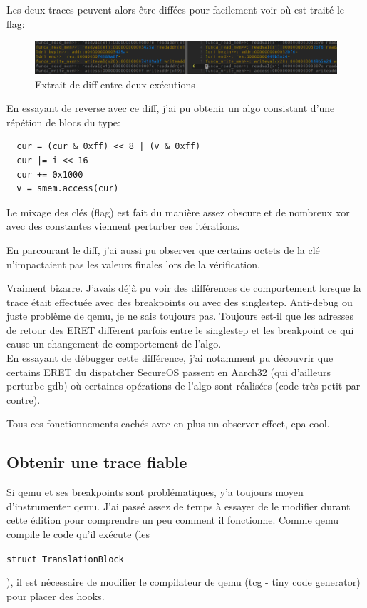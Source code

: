 \documentclass[14pt]{article}
\newcommand{\inlinebox}[2]{%
\colorbox{bg}{%
\parbox[b][0.6em]{\widthof{\texttt{#2}}}{\texttt{#2}}
}
}
\newcommand{\inlinec}[1]{ \inlinebox{c}{#1} }
\theoremstyle{definition}
\begin{document}
Les deux traces peuvent alors être diffées pour facilement voir où est traité le flag:
\begin{figure}[H]
\centering
\includegraphics[width=1.0\textwidth]{./screenshots/p3_diff_2.png}
  \caption{Extrait de diff entre deux exécutions}
  \label{fig:p3_diff_example}
\end{figure}

En essayant de reverse avec ce diff, j'ai pu obtenir un algo consistant d'une répétion de blocs du type:
\begin{verbatim}
  cur = (cur & 0xff) << 8 | (v & 0xff)
  cur |= i << 16
  cur += 0x1000
  v = smem.access(cur)
\end{verbatim}


Le mixage des clés (flag) est fait du manière assez obscure et de nombreux xor avec des constantes viennent perturber ces itérations.

En parcourant le diff, j'ai aussi pu observer que certains octets de la clé n'impactaient pas les valeurs finales lors de la vérification.

Vraiment bizarre. J'avais déjà pu voir des différences de comportement lorsque la trace était effectuée avec des breakpoints ou avec des singlestep.
Anti-debug ou juste problème de qemu, je ne sais toujours pas. Toujours est-il que les adresses de retour des ERET diffèrent parfois entre le singlestep et les breakpoint ce qui cause un changement de comportement de l'algo. \\



En essayant de débugger cette différence, j'ai notamment pu découvrir que certains ERET du dispatcher SecureOS passent en Aarch32 (qui d'ailleurs perturbe gdb) où certaines opérations de l'algo sont réalisées (code très petit par contre).

Tous ces fonctionnements cachés avec en plus un observer effect, cpa cool.


\subsection{\:Obtenir une trace fiable}
Si qemu et ses breakpoints sont problématiques, y'a toujours moyen d'instrumenter qemu.
J'ai passé assez de temps à essayer de le modifier durant cette édition pour comprendre un peu comment il fonctionne.
Comme qemu compile le code qu'il exécute (les \inlinec{struct TranslationBlock}), il est nécessaire de modifier le compilateur de qemu (tcg - tiny code generator) pour placer des hooks. \\ 
\end{document}
